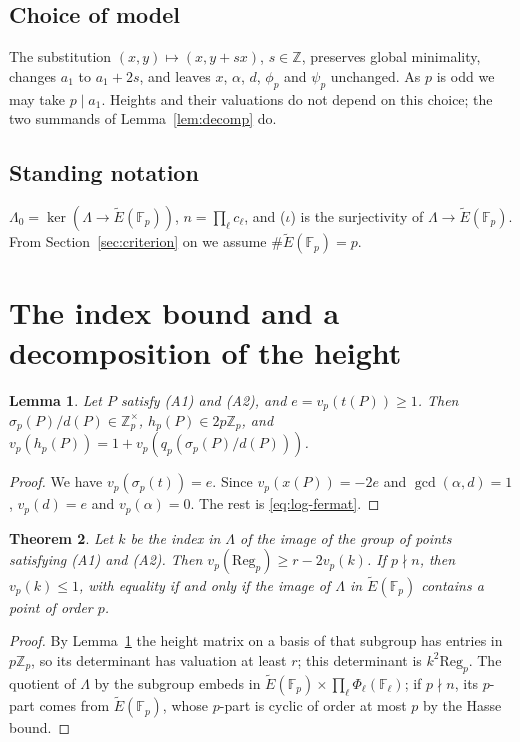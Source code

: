 \documentclass[11pt,a4paper]{amsart}
\newcommand{\Z}{\mathbb{Z}}
\newcommand{\F}{\mathbb{F}}
\newcommand{\Zp}{\mathbb{Z}_p}
\newcommand{\Fp}{\mathbb{F}_p}
\newcommand{\Reg}{\mathrm{Reg}}
\newcommand{\Et}{\widetilde{E}}
\newcommand{\Lam}{\Lambda}
\newcommand{\qp}{q_p}
\theoremstyle{plain}
\newtheorem{theorem}{Theorem}[section]
\newtheorem{lemma}[theorem]{Lemma}
\theoremstyle{definition}
\theoremstyle{remark}
\begin{document}
\subsection*{Choice of model}
The substitution $(x,y)\mapsto(x,y+sx)$, $s\in\Z$, preserves global minimality, changes $a_1$ to $a_1+2s$, and leaves $x$, $\alpha$, $d$, $\phi_p$ and $\psi_p$ unchanged. As $p$ is odd we may take $p\mid a_1$. Heights and their valuations do not depend on this choice; the two summands of Lemma~\ref{lem:decomp} do.

\subsection*{Standing notation}
$\Lam_0=\ker(\Lam\to\Et(\Fp))$, $n=\prod_\ell c_\ell$, and ($\iota$) is the surjectivity of $\Lam\to\Et(\Fp)$. From Section~\ref{sec:criterion} on we assume $\#\Et(\Fp)=p$.

\section{The index bound and a decomposition of the height}\label{sec:baseline}

\begin{lemma}\label{lem:A1A2}
Let $P$ satisfy \textup{(A1)} and \textup{(A2)}, and $e=v_p(t(P))\ge1$. Then $\sigma_p(P)/d(P)\in\Zp^\times$, $h_p(P)\in2p\Zp$, and $v_p(h_p(P))=1+v_p(\qp(\sigma_p(P)/d(P)))$.
\end{lemma}

\begin{proof}
We have $v_p(\sigma_p(t))=e$. Since $v_p(x(P))=-2e$ and $\gcd(\alpha,d)=1$, $v_p(d)=e$ and $v_p(\alpha)=0$. The rest is \eqref{eq:log-fermat}.
\end{proof}

\begin{theorem}\label{thm:baseline}
Let $k$ be the index in $\Lam$ of the image of the group of points satisfying \textup{(A1)} and \textup{(A2)}. Then $v_p(\Reg_p)\ge r-2v_p(k)$. If $p\nmid n$, then $v_p(k)\le1$, with equality if and only if the image of $\Lam$ in $\Et(\Fp)$ contains a point of order $p$.
\end{theorem}

\begin{proof}
By Lemma~\ref{lem:A1A2} the height matrix on a basis of that subgroup has entries in $p\Zp$, so its determinant has valuation at least $r$; this determinant is $k^2\Reg_p$. The quotient of $\Lam$ by the subgroup embeds in $\Et(\Fp)\times\prod_\ell\Phi_\ell(\F_\ell)$; if $p\nmid n$, its $p$-part comes from $\Et(\Fp)$, whose $p$-part is cyclic of order at most $p$ by the Hasse bound.
\end{proof}
\end{document}
